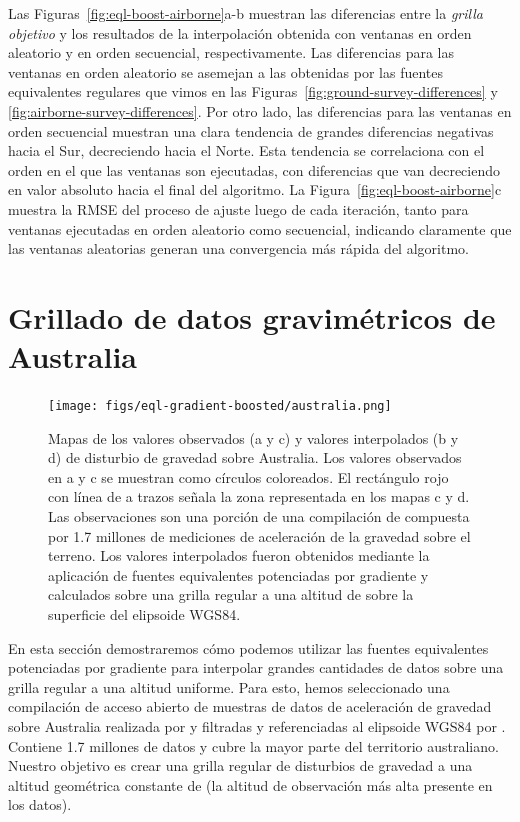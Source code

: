 Las Figuras~\ref{fig:eql-boost-airborne}a-b
muestran las diferencias entre la \emph{grilla objetivo} y los resultados de la
interpolación obtenida con ventanas en orden aleatorio y en orden secuencial,
respectivamente.
Las diferencias para las ventanas en orden aleatorio se asemejan a las
obtenidas por las fuentes equivalentes regulares que vimos en las
Figuras~\ref{fig:ground-survey-differences}
y \ref{fig:airborne-survey-differences}.
Por otro lado, las diferencias para las ventanas en orden secuencial muestran
una clara tendencia de grandes diferencias negativas hacia el Sur, decreciendo
hacia el Norte.
Esta tendencia se correlaciona con el orden en el que las ventanas son
ejecutadas, con diferencias que van decreciendo en valor absoluto hacia el
final del algoritmo.
La Figura~\ref{fig:eql-boost-airborne}c
muestra la \ac{RMSE} del proceso de ajuste luego de cada iteración, tanto para
ventanas ejecutadas en orden aleatorio como secuencial, indicando claramente
que las ventanas aleatorias generan una convergencia más rápida del algoritmo.



\section{Grillado de datos gravimétricos de Australia}

\begin{figure}[p]
    \texttt{[image: figs/eql-gradient-boosted/australia.png]}
    \caption{
        Mapas de los valores observados (a y c) y valores interpolados (b y d)
        de disturbio de gravedad sobre Australia.
        Los valores observados en a y c se muestran como círculos coloreados.
        El rectángulo rojo con línea de a trazos señala la zona representada en
        los mapas c y d.
        Las observaciones son una porción de una compilación de
        \citet{wynne2018} compuesta por 1.7 millones de mediciones de
        aceleración de la gravedad sobre el terreno.
        Los valores interpolados fueron obtenidos mediante la aplicación de
        fuentes equivalentes potenciadas por gradiente y calculados sobre una
        grilla regular a una altitud de \AustraliaEqlGridHeight{} sobre la
        superficie del elipsoide WGS84.
    }
    \label{fig:australia}
\end{figure}

En esta sección demostraremos cómo podemos utilizar las fuentes equivalentes
potenciadas por gradiente para interpolar grandes cantidades de datos sobre
una grilla regular a una altitud uniforme.
Para esto, hemos seleccionado una compilación de acceso abierto de muestras de
datos de aceleración de gravedad sobre Australia realizada por
\citet{wynne2018} y filtradas y referenciadas al elipsoide WGS84 por
\citet{australia_compilation}.
Contiene 1.7 millones de datos y cubre la mayor parte del territorio
australiano.
Nuestro objetivo es crear una grilla regular de disturbios de gravedad a una
altitud geométrica constante de \AustraliaEqlGridHeight{} (la altitud de
observación más alta presente en los datos).

